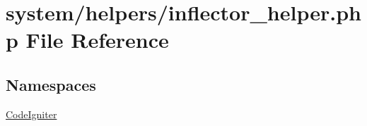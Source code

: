 \hypertarget{inflector__helper_8php}{}\section{system/helpers/inflector\+\_\+helper.php File Reference}
\label{inflector__helper_8php}
\subsection*{Namespaces}
\begin{DoxyCompactItemize}
\item 
 \mbox{\hyperlink{namespace_code_igniter}{Code\+Igniter}}
\end{DoxyCompactItemize}

